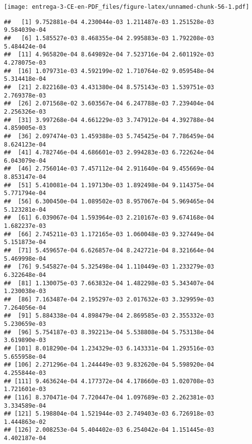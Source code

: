 \documentclass[
]{article}
\newenvironment{Shaded}{\begin{snugshade}}{\end{snugshade}}
\newcommand{\DataTypeTok}[1]{\textcolor[rgb]{0.13,0.29,0.53}{#1}}
\newcommand{\DecValTok}[1]{\textcolor[rgb]{0.00,0.00,0.81}{#1}}
\newcommand{\KeywordTok}[1]{\textcolor[rgb]{0.13,0.29,0.53}{\textbf{#1}}}
\newcommand{\NormalTok}[1]{#1}
\newcommand{\OperatorTok}[1]{\textcolor[rgb]{0.81,0.36,0.00}{\textbf{#1}}}
\newcommand{\StringTok}[1]{\textcolor[rgb]{0.31,0.60,0.02}{#1}}
\begin{document}
\texttt{[image: entrega-3-CE-en-PDF\_files/figure-latex/unnamed-chunk-56-1.pdf]}

\begin{Shaded}
\end{Shaded}

\begin{verbatim}
##   [1] 9.752881e-04 4.230044e-03 1.211487e-03 1.251528e-03 9.584039e-04
##   [6] 1.585527e-03 8.468355e-04 2.995883e-03 1.792208e-03 5.484424e-04
##  [11] 4.965820e-04 8.649892e-04 7.523716e-04 2.601192e-03 4.278075e-03
##  [16] 1.079731e-03 4.592199e-02 1.710764e-02 9.059548e-04 5.314418e-04
##  [21] 2.822168e-03 4.431380e-04 8.575143e-03 1.539751e-03 2.769378e-03
##  [26] 2.071568e-02 3.603567e-04 6.247788e-03 7.239404e-04 2.256326e-03
##  [31] 3.997268e-04 4.661229e-03 3.747912e-04 4.392788e-04 4.859005e-03
##  [36] 2.097474e-03 1.459388e-03 5.745425e-04 7.786459e-04 8.624123e-04
##  [41] 4.782746e-04 4.686601e-03 2.994283e-03 6.722624e-04 6.043079e-04
##  [46] 2.756014e-03 7.457112e-04 2.911640e-04 9.455669e-04 8.853147e-04
##  [51] 5.410081e-04 1.197130e-03 1.892498e-04 9.114375e-04 5.771794e-04
##  [56] 6.300450e-04 1.089502e-03 8.957067e-04 5.969465e-04 5.123281e-04
##  [61] 6.039067e-04 1.593964e-03 2.210167e-03 9.674168e-04 1.682237e-03
##  [66] 2.745211e-03 1.172165e-03 1.060048e-03 9.327449e-04 5.151873e-04
##  [71] 5.459657e-04 6.626857e-04 8.242721e-04 8.321664e-04 5.469998e-04
##  [76] 9.545827e-04 5.325498e-04 1.110449e-03 1.233279e-03 6.322648e-04
##  [81] 1.130075e-03 7.663832e-04 1.482298e-03 5.343407e-04 1.230038e-03
##  [86] 7.163487e-04 2.195297e-03 2.017632e-03 3.329959e-03 7.264056e-04
##  [91] 5.884338e-04 4.898479e-04 2.869585e-03 2.355332e-03 5.230659e-03
##  [96] 5.754187e-03 8.392213e-04 5.538808e-04 5.753138e-04 3.619890e-03
## [101] 8.018290e-04 1.234329e-03 6.143331e-04 1.293516e-03 5.655958e-04
## [106] 2.271296e-04 1.244449e-03 9.832620e-04 5.598920e-04 4.255844e-03
## [111] 9.463624e-04 4.177372e-04 4.178660e-03 1.020708e-03 1.721601e-03
## [116] 8.370471e-04 7.720447e-04 1.097689e-03 2.262381e-03 3.334589e-04
## [121] 5.198804e-04 1.521944e-03 2.749403e-03 6.726918e-03 1.444863e-02
## [126] 2.008253e-04 5.404402e-03 6.254042e-04 1.151445e-03 4.402187e-04

\end{verbatim}
\end{document}
